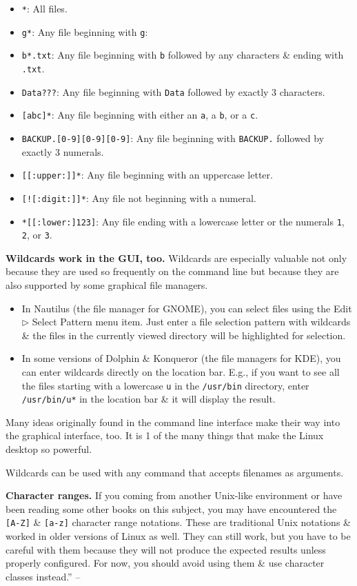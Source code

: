 \documentclass[oneside]{book}
\numberwithin{equation}{section}
\begin{document}
\begin{itemize}
	\item \texttt{*}: All files.
	\item \texttt{g*}: Any file beginning with \texttt{g}:
	\item \texttt{b*.txt}: Any file beginning with \texttt{b} followed by any characters \& ending with \texttt{.txt}.
	\item \texttt{Data???}: Any file beginning with \texttt{Data} followed by exactly 3 characters.
	\item \texttt{[abc]*}: Any file beginning with either an \texttt{a}, a \texttt{b}, or a \texttt{c}.
	\item \texttt{BACKUP.[0-9][0-9][0-9]}: Any file beginning with \texttt{BACKUP.} followed by exactly 3 numerals.
	\item \texttt{[[:upper:]]*}: Any file beginning with an uppercase letter.
	\item \texttt{[![:digit:]]*}: Any file not beginning with a numeral.
	\item \texttt{*[[:lower:]123]}: Any file ending with a lowercase letter or the numerals \texttt{1}, \texttt{2}, or \texttt{3}.
\end{itemize}
\textbf{Wildcards work in the GUI, too.} Wildcards are especially valuable not only because they are used so frequently on the command line but because they are also supported by some graphical file managers.
\begin{itemize}
	\item In Nautilus (the file manager for GNOME), you can select files using the Edit $\triangleright$ Select Pattern menu item. Just enter a file selection pattern with wildcards \& the files in the currently viewed directory will be highlighted for selection.
	\item In some versions of Dolphin \& Konqueror (the file managers for KDE), you can enter wildcards directly on the location bar. E.g., if you want to see all the files starting with a lowercase \texttt{u} in the \texttt{/usr/bin} directory, enter \texttt{/usr/bin/u*} in the location bar \& it will display the result.
\end{itemize}
Many ideas originally found in the command line interface make their way into the graphical interface, too. It is 1 of the many things that make the Linux desktop so powerful.

Wildcards can be used with any command that accepts filenames as arguments.

\textbf{Character ranges.} If you coming from another Unix-like environment or have been reading some other books on this subject, you may have encountered the \texttt{[A-Z]} \& \texttt{[a-z]} character range notations. These are traditional Unix notations \& worked in older versions of Linux as well. They can still work, but you have to be careful with them because they will not produce the expected results unless properly configured. For now, you should avoid using them \& use character classes instead.'' -- \cite[pp. 65--67]{Shotts2019}
\end{document}
